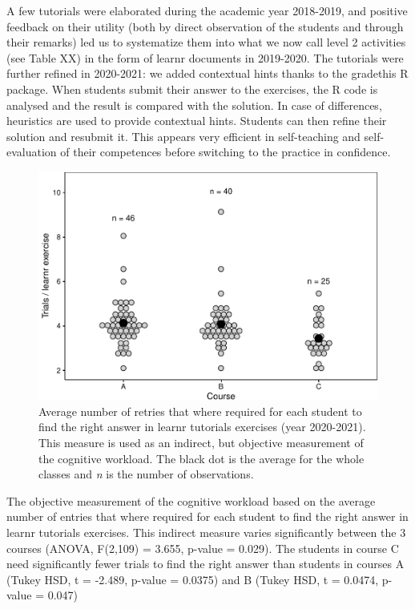\documentclass[
]{article}
\begin{document}
A few tutorials were elaborated during the academic year 2018-2019, and
positive feedback on their utility (both by direct observation of the
students and through their remarks) led us to systematize them into what
we now call level 2 activities (see Table XX) in the form of learnr
documents in 2019-2020. The tutorials were further refined in 2020-2021:
we added contextual hints thanks to the gradethis R package. When
students submit their answer to the exercises, the R code is analysed
and the result is compared with the solution. In case of differences,
heuristics are used to provide contextual hints. Students can then
refine their solution and resubmit it. This appears very efficient in
self-teaching and self-evaluation of their competences before switching
to the practice in confidence.

\begin{figure}
\centering
\includegraphics{teaching_data_science_files/figure-latex/fig_learn_trials-1.pdf}
\caption{Average number of retries that where required for each student
to find the right answer in learnr tutorials exercises (year 2020-2021).
This measure is used as an indirect, but objective measurement of the
cognitive workload. The black dot is the average for the whole classes
and \emph{n} is the number of observations.}
\end{figure}

The objective measurement of the cognitive workload based on the average
number of entries that where required for each student to find the right
answer in learnr tutorials exercises. This indirect measure varies
significantly between the 3 courses (ANOVA, F(2,109) = 3.655, p-value =
0.029). The students in course C need significantly fewer trials to find
the right answer than students in courses A (Tukey HSD, t = -2.489,
p-value = 0.0375) and B (Tukey HSD, t = 0.0474, p-value = 0.047)
\end{document}
